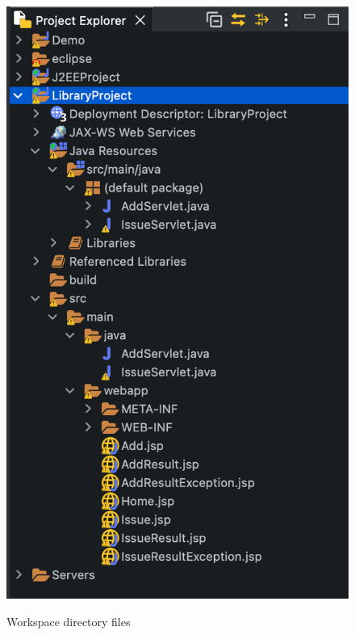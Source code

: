 \documentclass[12pt]{article}
\begin{document}
\begin{figure}[!hbt]
    \centering
    \includegraphics[scale=0.33]{screenshots/b3_01.png}
    \label{fig:my_label1}
    \caption{Workspace directory files}
\end{figure}
\end{document}
